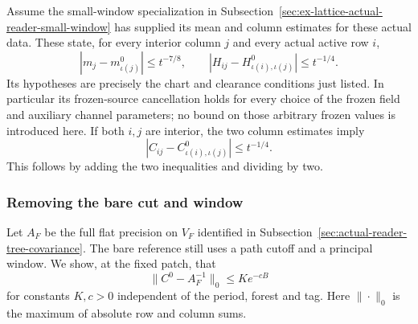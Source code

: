 Assume the small-window specialization in
Subsection~\ref{sec:ex-lattice-actual-reader-small-window} has supplied its
mean and column estimates for these actual data. These state, for every
interior column $j$ and every actual active row $i$,
\begin{equation}\label{eq:reader-local-column-price}
 |m_j-m^0_{\iota(j)}|\le t^{-7/8},\qquad
 |H_{ij}-H^0_{\iota(i),\iota(j)}|\le t^{-1/4}.
\end{equation}
Its hypotheses are precisely the chart and clearance conditions just
listed. In particular its frozen-source cancellation holds for every
choice of the frozen field and auxiliary channel parameters; no
bound on those arbitrary frozen values is introduced here.
If both $i,j$ are interior, the two column estimates imply
\begin{equation}\label{eq:reader-local-symmetric-price}
 |C_{ij}-C^0_{\iota(i),\iota(j)}|\le t^{-1/4}.
\end{equation}
This follows by adding the two inequalities and dividing by two.

\subsubsection{Removing the bare cut and window}

Let $A_F$ be the full flat precision on $V_F$ identified in
Subsection~\ref{sec:actual-reader-tree-covariance}. The bare reference
still uses a path cutoff and a principal window. We show, at the
fixed patch, that
\begin{equation}\label{eq:reader-bare-full-price}
 \|C^0-A_F^{-1}\|_0\le K e^{-cB}
\end{equation}
for constants $K,c>0$ independent of the period, forest and tag.
Here $\|\cdot\|_0$ is the maximum of absolute row and column sums.

